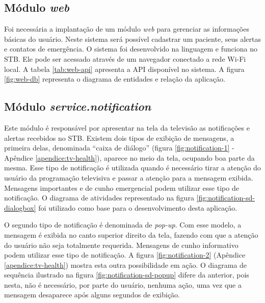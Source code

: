 \subsection{Módulo \textit{web}}

Foi necessária a implantação de um módulo \textit{web} para gerenciar as 
informações básicas do usuário. Neste sistema será possível cadastrar um 
paciente, seus alertas e contatos de emergência. O sistema foi desenvolvido
na linguagem \python[] e funciona no STB. Ele pode ser acessado através de
um navegador conectado a rede Wi-Fi local. A tabela \ref{tab:web-api} apresenta
a API disponível no sistema. A figura \vref{fig:web-db} representa o diagrama
de entidades e relação da aplicação.


\subsection{Módulo \textit{service.notification}}\label{subsubsec:notification}

Este módulo é responsável por apresentar na tela da televisão as notificações e
alertas recebidos no STB. Existem dois tipos de exibição de mensagens, a
primeira delas, denominada ``caixa de diálogo'' (figura
\vref{fig:notification-1} - Apêndice \ref{apendice:tv-health}), 
aparece no meio da tela, ocupando boa parte da mesma.
Esse tipo de notificação é utilizada quando é necessário tirar a atenção do
usuário da programação televisiva e passar a atenção para a mensagem exibida.
Mensagens importantes e de cunho emergencial podem utilizar esse tipo de
notificação. O diagrama de atividades representado na figura
\ref{fig:notification-sd-dialogbox} foi utilizado como base para o
desenvolvimento desta aplicação.



O segundo tipo de notificação é denominada de \textit{pop-up}. Com esse modelo,
a mensagem é exibida no canto superior direito da tela, fazendo com que a
atenção do usuário não seja totalmente requerida. Mensagens de cunho informativo
podem utilizar esse tipo de notificação. A figura \ref{fig:notification-2} 
(Apêndice \ref{apendice:tv-health}) mostra esta outra possibilidade em ação.
O diagrama de sequência ilustrado na figura \ref{fig:notification-sd-popup}
difere da anterior, pois nesta, não é necessário, por parte do usuário, nenhuma
ação, uma vez que a mensagem desaparece após alguns segundos de exibição.

